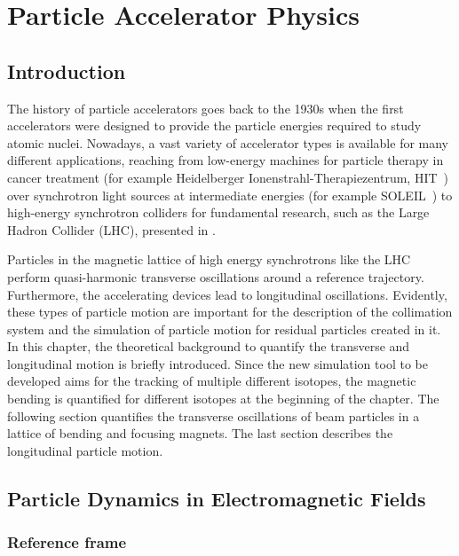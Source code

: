 \chapter{Particle Accelerator Physics}\label{chap:2}
%
\section*{Introduction}
%
The history of particle accelerators goes back to the 1930s when the first accelerators were designed to provide the particle energies required to study atomic nuclei. Nowadays, a vast variety of accelerator types is available for many different applications, reaching from low-energy machines for particle therapy in cancer treatment (for example Heidelberger Ionenstrahl-Therapiezentrum, HIT~\cite{HITref01}) over synchrotron light sources at intermediate energies (for example SOLEIL~\cite{SOLEILref01}) to high-energy synchrotron colliders for fundamental research, such as the Large Hadron Collider (LHC), presented in .


Particles in the magnetic lattice of high energy synchrotrons like the LHC perform quasi-harmonic transverse oscillations around a reference trajectory. Furthermore, the accelerating devices lead to longitudinal oscillations. Evidently, these types of particle motion are important for the description of the collimation system and the simulation of particle motion for residual particles created in it. In this chapter, the theoretical background to quantify the transverse and longitudinal motion is briefly introduced. Since the new simulation tool to be developed aims for the tracking of multiple different isotopes, the magnetic bending is quantified for different isotopes at the beginning of the chapter. The following section quantifies the transverse oscillations of beam particles in a lattice of bending and focusing magnets. The last section describes the longitudinal particle motion.

%

\section{Particle Dynamics in Electromagnetic Fields}

\subsection{Reference frame} \label{chap:refframe}






